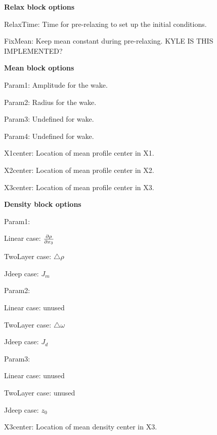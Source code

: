 \textbf{Relax block options}
\begin{description}
  \item RelaxTime: Time for pre-relaxing to set up the initial conditions. 
  \item FixMean: Keep mean constant during pre-relaxing. KYLE IS THIS IMPLEMENTED?
\end{description}

\textbf{Mean block options}
\begin{description}
  \item Param1: Amplitude for the wake.
  \item Param2: Radius for the wake.
  \item Param3: Undefined for wake.
  \item Param4: Undefined for wake.
  \item X1center: Location of mean profile center in X1.
  \item X2center: Location of mean profile center in X2.
  \item X3center: Location of mean profile center in X3.
\end{description}

\textbf{Density block options}
\begin{description}
  \item Param1: 
    \begin{description}
      \item Linear case: $\frac{\partial \rho}{\partial x_3}$
      \item TwoLayer case: $\triangle \rho$
      \item Jdeep case: $J_m$
    \end{description}
  \item Param2: 
    \begin{description}
      \item Linear case: unused
      \item TwoLayer case: $\triangle \omega$
      \item Jdeep case: $J_d$
    \end{description}
  \item Param3: 
    \begin{description}
      \item Linear case: unused
      \item TwoLayer case: unused
      \item Jdeep case: $z_0$
    \end{description}
  \item X3center: Location of mean density center in X3.
\end{description}

